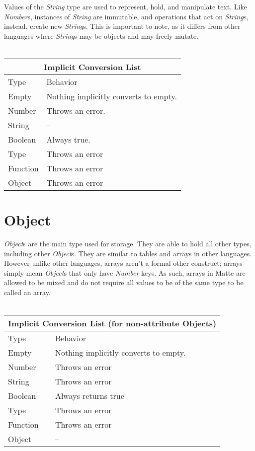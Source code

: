 \documentclass[12pt,letterpaper]{report}
\begin{document}
Values of the \textit{String} type are used to represent, hold, and manipulate text.
Like \textit{Number}s, instances of \textit{String} are immutable, and operations 
that act on \textit{String}s, instead, create new \textit{String}s. This is 
important to note, as it differs from other languages where \textit{String}s 
may be objects and may freely mutate.
\\\\
{
\centering
\begin{tabular}{ |p{2.5cm}||p{10cm}|  }
  \hline
  \multicolumn{2}{|c|}{Implicit Conversion List} \\
  \hline
  Type & Behavior\\
  \hline
  Empty & Nothing implicitly converts to empty.\\
  Number  & Throws an error. \\
  String & --\\
  Boolean & Always true. \\
  Type & Throws an error\\
  Function & Throws an error\\
  Object & Throws an error\\
 \hline
\end{tabular}
}





\section{Object}\label{Object}

\textit{Object}s are the main type used for storage. They are able to hold all other types, including 
other \textit{Object}s. They are similar to tables and arrays in other languages. However
unlike other languages, arrays aren't a formal other construct; arrays simply mean 
\textit{Object}s that only have \textit{Number} keys. As such, arrays in Matte are allowed to be 
mixed and do not require all values to be of the same type to be called an array.
\\\\
{
\centering
\begin{tabular}{ |p{2.5cm}||p{10cm}|  }
  \hline
  \multicolumn{2}{|c|}{Implicit Conversion List (for non-attribute Objects)} \\
  \hline
  Type & Behavior\\
  \hline
  Empty & Nothing implicitly converts to empty.\\
  Number  & Throws an error \\
  String & Throws an error\\
  Boolean & Always returns true \\
  Type & Throws an error\\
  Function & Throws an error\\
  Object & --\\
 \hline
\end{tabular}
}
\end{document}
